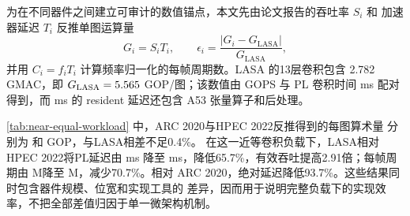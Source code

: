 \begin{table}[t]
\centering
\caption{YOLOv3-tiny近等计算负载的定量比较。GOP/图按公开吞吐率与延迟反推；
等级A表示标准网络家族且算术量偏差不超过5\%，等级B表示网络图或系统边界发生改变。}
\label{tab:near-equal-workload}
\small
\setlength{\tabcolsep}{4.2pt}
\end{table}

为在不同器件之间建立可审计的数值锚点，本文先由论文报告的吞吐率 $S_i$ 和
加速器延迟 $T_i$ 反推单图运算量
\begin{equation}
G_i=S_iT_i,
\qquad
\epsilon_i=\frac{|G_i-G_{\mathrm{LASA}}|}{G_{\mathrm{LASA}}},
\label{eq:related-workload}
\end{equation}
并用 $C_i=f_iT_i$ 计算频率归一化的每帧周期数。LASA 的13层卷积包含
2.782 GMAC，即 $G_{\mathrm{LASA}}=5.565{}$ GOP/图；该数值由
\PLEffectiveGOPS{} GOPS 与 PL 卷积时间 \PLMeanMs{} ms 配对得到，而
\ResidentMeanMs{} ms 的 resident 延迟还包含 A53 张量算子和后处理。

\cref{tab:near-equal-workload} 中，ARC 2020与HPEC 2022反推得到的每图算术量
分别为 \ARCGOPPerImage{} 和 \HPECGOPPerImage{} GOP，与LASA相差不足0.4\%。
在这一近等卷积负载下，LASA相对HPEC 2022将PL延迟由 \HPECLatencyMs{} ms
降至 \PLMeanMs{} ms，降低65.7\%，有效吞吐提高2.91倍；每帧周期由
\HPECCyclesPerImage{} M降至 \LASACyclesPerImage{} M，减少70.7\%。相对
ARC 2020，绝对延迟降低93.7\%。这些结果同时包含器件规模、位宽和实现工具的
差异，因而用于说明完整负载下的实现效率，不把全部差值归因于单一微架构机制。

